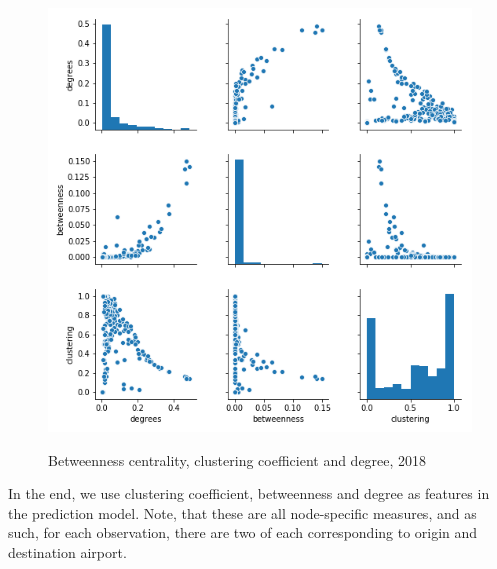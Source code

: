 \begin{figure}[H]
  \centering
  \caption{Betweenness centrality, clustering coefficient and degree, 2018}
    \includegraphics[width=1 \textwidth]{Exam/Figures/NxPairPlot.png}
  \label{fig:Btwns_CC}
\end{figure}
\noindent
In the end, we use clustering coefficient, betweenness and degree as features in the prediction model. Note, that these are all node-specific measures, and as such, for each observation, there are two of each corresponding to origin and destination airport. 

